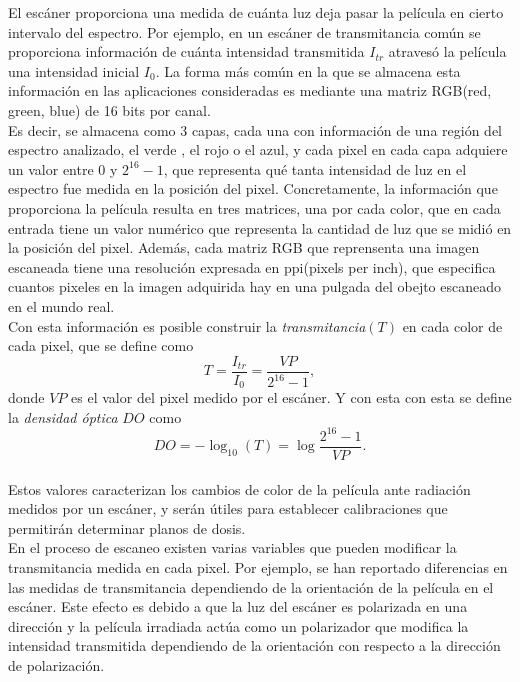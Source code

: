 El escáner proporciona una medida de cuánta luz deja pasar la película en cierto intervalo del espectro. Por ejemplo, en un escáner de transmitancia común  se proporciona información de cuánta intensidad transmitida $I_{tr}$ atravesó la película una intensidad inicial $I_0$. La forma más común en la que se almacena esta información en las aplicaciones consideradas es mediante una matriz RGB(red, green, blue) de 16 bits por canal. \\

Es decir, se almacena como 3 capas, cada una con información de una región del espectro analizado, el verde , el rojo o el azul, y cada pixel en cada capa adquiere un valor entre $0$ y $2^{16}-1$, que representa qué tanta intensidad de luz en el espectro fue medida en la posición del pixel. Concretamente, la información que proporciona la película resulta en tres matrices, una por cada color, que en cada entrada tiene un valor numérico que representa la cantidad de luz que se midió en la posición del pixel. Además, cada matriz RGB que reprensenta una imagen escaneada tiene una resolución expresada en ppi(pixels per inch), que especifica cuantos pixeles en la imagen adquirida hay en una pulgada del obejto escaneado en el mundo real.\\

Con esta información es posible construir la \textit{transmitancia}$(T)$ en cada color de cada pixel, que se define como 
\begin{equation}
	T=\frac{I_{tr}}{I_0}=\frac{VP}{2^{16}-1},
\end{equation}
donde $VP$ es el valor del pixel medido por el escáner. Y con esta con esta se define la \textit{densidad óptica} $DO$ como 
\begin{equation}
	DO=-\log_{10}(T)=\log \frac{2^{16}-1}{VP}.
\end{equation}\\

Estos valores caracterizan los cambios de color de la película ante radiación medidos por un escáner, y serán útiles para establecer calibraciones que permitirán determinar planos de dosis.\\

En el proceso de escaneo existen varias variables que pueden modificar la transmitancia medida en cada pixel. Por ejemplo, se han reportado diferencias en las medidas de transmitancia dependiendo de la orientación de la película en el escáner\cite{mayers}. Este efecto es debido a que la luz del escáner es polarizada en una dirección y la película irradiada actúa como un polarizador que modifica la intensidad transmitida dependiendo de la orientación con respecto a la dirección de polarización.\\

